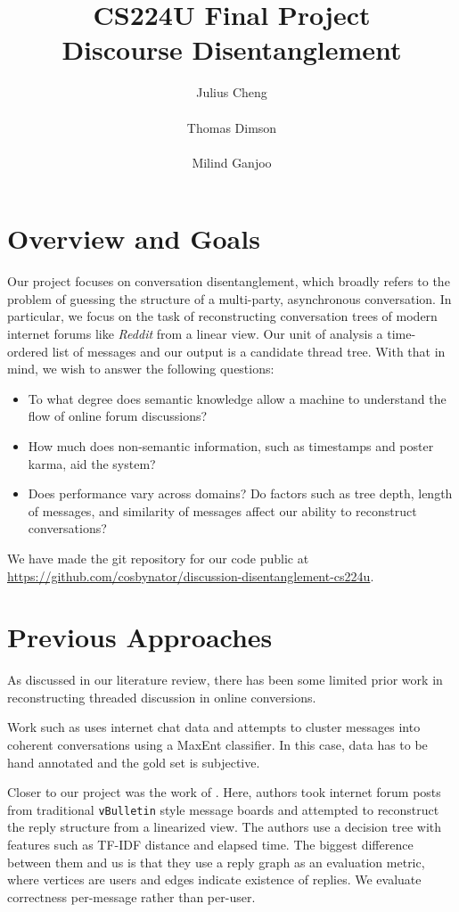 \documentclass[10pt]{article}
\title{{\small CS224U Final Project} \\ Discourse Disentanglement}
\author{Julius Cheng \\
  \\\And
  Thomas Dimson  \\
  \\\And
  Milind Ganjoo \\
}
\date{}
\begin{document}
\maketitle

\section{Overview and Goals}
Our project focuses on conversation disentanglement, which broadly refers to
the problem of guessing the structure of a multi-party, asynchronous
conversation. In particular, we focus on the task of reconstructing conversation
trees of modern internet forums like \textit{Reddit} from a linear view. Our unit of 
analysis a time-ordered list of messages and our output is a candidate thread tree. 
With that in mind, we wish to answer the following questions:

\begin{itemize}
  \item To what degree does semantic knowledge allow a machine to understand the 
    flow of online forum discussions?
  \item How much does non-semantic information, such as timestamps and poster karma,
    aid the system?
  \item Does performance vary across domains? Do factors such as tree depth,
    length of messages, and similarity of messages affect our ability to
    reconstruct conversations? 
\end{itemize}

We have made the git repository for our code public at 
\url{https://github.com/cosbynator/discussion-disentanglement-cs224u}.

\section{Previous Approaches}
\label{sec:approaches}
As discussed in our literature review, there has been some limited prior 
work in reconstructing threaded discussion in online conversions. 

Work such as \cite{Elsner2008a} 
uses internet chat data and attempts to cluster messages into coherent 
conversations using a MaxEnt classifier. In this case, data has to be hand annotated and
the gold set is subjective.

Closer to our project was the work of \cite{Aumayr2011a}. Here, authors took
internet forum posts from traditional \texttt{vBulletin} style message boards
and attempted to reconstruct the reply structure from a linearized view. The authors
use a decision tree with features such as TF-IDF distance and elapsed time. The biggest
difference between them and us is that they use a reply graph as an evaluation metric,
where vertices are users and edges indicate existence of replies. We evaluate correctness
per-message rather than per-user.
\end{document}
